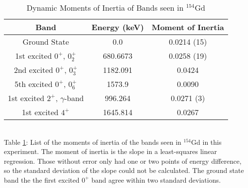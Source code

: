 \begin{table}[!]
    \centering
    \caption{Dynamic Moments of Inertia of Bands seen in $^{154}$Gd}
    \begin{tabular}{c|c|c}
        \toprule
        Band & Energy (keV) & Moment of Inertia  \\
        \hline
        Ground State & 0.0 & 0.0214 (15) \\
        1st excited $0^+$, $0^+_2$ & 680.6673 & 0.0258 (19) \\
        2nd excited $0^+$, $0^+_3$ & 1182.091 &  0.0424 \\
        5th excited $0^+$, $0^+_6$ & 1573.9 & 0.0090 \\
        1st excited $2^+$, $\gamma$-band & 996.264 &  0.0271 (3) \\
        1st excited $4^+$ & 1645.814 & 0.0267 \\
        \bottomrule
    \end{tabular}
    \\[2pt]
    \footnotesize
    \label{tab:154_Dynamic}
    Table \ref{tab:154_Dynamic}: List of the moments of inertia of the bands seen in $^{154}$Gd in this experiment. The moment of inertia is the slope in a least-squares linear regression. Those without error only had one or two points of energy difference, so the standard deviation of the slope could not be calculated. The ground state band the the first excited $0^+$ band agree within two standard deviations.
\end{table}